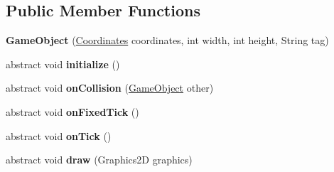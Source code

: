 \subsection*{Public Member Functions}
\begin{DoxyCompactItemize}
\item 
\mbox{\label{classde_1_1me_1_1edgelord_1_1sjgl_1_1gameobject_1_1_game_object_aafac6f204bd6af93e6cc220c1d713575}} 
{\bfseries Game\+Object} (\mbox{\hyperlink{classde_1_1me_1_1edgelord_1_1sjgl_1_1location_1_1_coordinates}{Coordinates}} coordinates, int width, int height, String tag)
\item 
\mbox{\label{classde_1_1me_1_1edgelord_1_1sjgl_1_1gameobject_1_1_game_object_adf7f5ff55b2d355bdae314983f396323}} 
abstract void {\bfseries initialize} ()
\item 
\mbox{\label{classde_1_1me_1_1edgelord_1_1sjgl_1_1gameobject_1_1_game_object_a30952cacde1130460af217db3c3152b1}} 
abstract void {\bfseries on\+Collision} (\mbox{\hyperlink{classde_1_1me_1_1edgelord_1_1sjgl_1_1gameobject_1_1_game_object}{Game\+Object}} other)
\item 
\mbox{\label{classde_1_1me_1_1edgelord_1_1sjgl_1_1gameobject_1_1_game_object_a26eb98737c3dbc41b2cf495cb3cda7c6}} 
abstract void {\bfseries on\+Fixed\+Tick} ()
\item 
\mbox{\label{classde_1_1me_1_1edgelord_1_1sjgl_1_1gameobject_1_1_game_object_ac7f506063a1141a43bfeb9f0a2fe2cef}} 
abstract void {\bfseries on\+Tick} ()
\item 
\mbox{\label{classde_1_1me_1_1edgelord_1_1sjgl_1_1gameobject_1_1_game_object_a3a0c768670063cdc8517e1cdce9a492e}} 
abstract void {\bfseries draw} (Graphics2D graphics)
\item 
\mbox{\label{classde_1_1me_1_1edgelord_1_1sjgl_1_1gameobject_1_1_game_object_a255595cb63b17130620f5a1810c274c6}} 

\end{DoxyCompactItemize}
